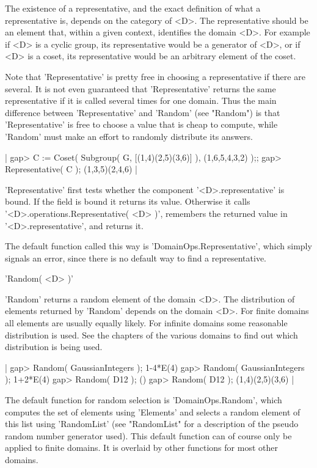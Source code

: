 The existence of  a representative, and the exact  definition of  what  a
representative  is, depends on the category  of  <D>.  The representative
should be an  element that, within a given context, identifies the domain
<D>.  For example if <D> is a cyclic group, its representative would be a
generator of <D>, or if <D> is  a  coset, its representative  would be an
arbitrary element of the coset.

Note that 'Representative' is pretty free in choosing a representative if
there are  several.   It is not  even  guaranteed   that 'Representative'
returns the same  representative if it  is called several  times for  one
domain.  Thus  the main difference  between 'Representative' and 'Random'
(see "Random") is that 'Representative' is free to choose a value that is
cheap  to  compute,  while 'Random'   must  make an  effort  to  randomly
distribute its answers.

|    gap> C := Coset( Subgroup( G, [(1,4)(2,5)(3,6)] ), (1,6,5,4,3,2) );;
    gap> Representative( C );
    (1,3,5)(2,4,6) |

'Representative'  first tests whether  the component '<D>.representative'
is  bound.  If the  field is bound it  returns its  value.   Otherwise it
calls  '<D>.operations.Representative(  <D>  )',  remembers the  returned
value in '<D>.representative', and returns it.

The default function called this way is 'DomainOps.Representative', which
simply signals  an error,  since  there  is  no  default  way  to  find a
representative.

%

'Random( <D> )'

'Random' returns a random element of the domain <D>.  The distribution of
elements returned  by 'Random'  depends on  the domain  <D>.  For  finite
domains all  elements are usually  equally likely.   For infinite domains
some reasonable  distribution is used.  See the   chapters of the various
domains to find out which distribution is being used.

|    gap> Random( GaussianIntegers );
    1-4*E(4)
    gap> Random( GaussianIntegers );
    1+2*E(4)
    gap> Random( D12 );
    ()
    gap> Random( D12 );
    (1,4)(2,5)(3,6) |

The default function for random selection  is  'DomainOps.Random',  which
computes  the  set of  elements  using  'Elements'  and selects  a random
element  of  this  list  using  'RandomList'  (see  "RandomList"   for  a
description of the pseudo random  number generator  used).  This  default
function can of course only be applied to finite domains.  It is overlaid
by other functions for most other domains.

